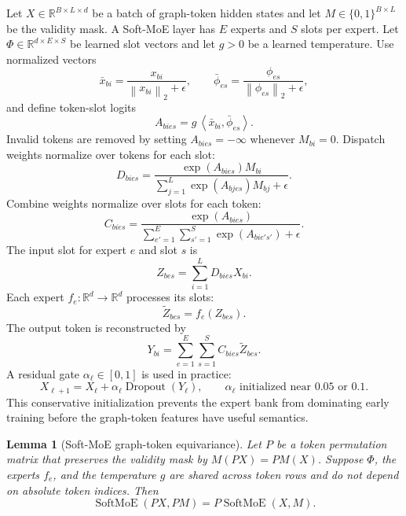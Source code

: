 \documentclass[11pt]{article}
\theoremstyle{definition}
\theoremstyle{plain}
\newtheorem{lemma}[definition]{Lemma}
\theoremstyle{remark}
\numberwithin{equation}{section}
\newcommand{\R}{\mathbb{R}}
\newcommand{\norm}[1]{\left\lVert #1\right\rVert}
\newcommand{\ip}[2]{\left\langle #1,#2\right\rangle}
\begin{document}
Let $X\in\R^{B\times L\times d}$ be a batch of graph-token hidden states and let $M\in\{0,1\}^{B\times L}$ be the validity mask.  A Soft-MoE layer has $E$ experts and $S$ slots per expert.  Let $\Phi\in\R^{d\times E\times S}$ be learned slot vectors and let $g>0$ be a learned temperature.  Use normalized vectors
\begin{equation}
  \bar x_{b i}=\frac{x_{b i}}{\norm{x_{b i}}_2+\epsilon},\qquad
  \bar\phi_{e s}=\frac{\phi_{e s}}{\norm{\phi_{e s}}_2+\epsilon},
\end{equation}
and define token-slot logits
\begin{equation}
  A_{b i e s}=g\,\ip{\bar x_{b i}}{\bar\phi_{e s}}.
\end{equation}
Invalid tokens are removed by setting $A_{b i e s}=-\infty$ whenever $M_{b i}=0$.  Dispatch weights normalize over tokens for each slot:
\begin{equation}
  D_{b i e s}=\frac{\exp(A_{b i e s})M_{b i}}{\sum_{j=1}^L\exp(A_{b j e s})M_{b j}+\epsilon}.
\end{equation}
Combine weights normalize over slots for each token:
\begin{equation}
  C_{b i e s}=\frac{\exp(A_{b i e s})}{\sum_{e'=1}^E\sum_{s'=1}^S\exp(A_{b i e's'})+\epsilon}.
\end{equation}
The input slot for expert $e$ and slot $s$ is
\begin{equation}
  Z_{b e s}=\sum_{i=1}^L D_{b i e s}X_{b i}.
\end{equation}
Each expert $f_e:\R^d\to\R^d$ processes its slots:
\begin{equation}
  \widetilde Z_{b e s}=f_e(Z_{b e s}).
\end{equation}
The output token is reconstructed by
\begin{equation}
  Y_{b i}=\sum_{e=1}^E\sum_{s=1}^S C_{b i e s}\widetilde Z_{b e s}.
\end{equation}
A residual gate $\alpha_\ell\in[0,1]$ is used in practice:
\begin{equation}
  X_{\ell+1}=X_\ell+\alpha_\ell\operatorname{Dropout}(Y_\ell),\qquad \alpha_\ell\text{ initialized near }0.05\text{ or }0.1.
\end{equation}
This conservative initialization prevents the expert bank from dominating early training before the graph-token features have useful semantics.

\begin{lemma}[Soft-MoE graph-token equivariance]
Let $P$ be a token permutation matrix that preserves the validity mask by $M(PX)=PM(X)$.  Suppose $\Phi$, the experts $f_e$, and the temperature $g$ are shared across token rows and do not depend on absolute token indices.  Then
\begin{equation}
  \operatorname{SoftMoE}(PX,PM)=P\operatorname{SoftMoE}(X,M).
\end{equation}
\end{lemma}
\end{document}

